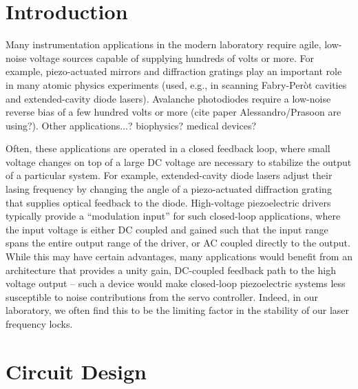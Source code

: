 \documentclass[aip,rsi,preprint,graphicx]{revtex4-1} %
\begin{document}
\section{Introduction}
\label{Sec:Introduction}

Many instrumentation applications in the modern laboratory require agile, low-noise voltage sources capable of supplying hundreds of volts or more.
For example, piezo-actuated mirrors and diffraction gratings play an important role in many atomic physics experiments (used, e.g., in scanning Fabry-Per{\`o}t cavities and extended-cavity diode lasers).
Avalanche photodiodes require a low-noise reverse bias of a few hundred volts or more (cite paper Alessandro/Prasoon are using?).
Other applications...? biophysics? medical devices?

Often, these applications are operated in a closed feedback loop, where small voltage changes on top of a large DC voltage are necessary to stabilize the output of a particular system.
For example, extended-cavity diode lasers adjust their lasing frequency by changing the angle of a piezo-actuated diffraction grating that supplies optical feedback to the diode.
High-voltage piezoelectric drivers typically provide a ``modulation input'' for  such closed-loop applications, where the input voltage is either DC coupled and gained such that the input range spans the entire output range of the driver, or AC coupled directly to the output.
While this may have certain advantages, many applications would benefit from an architecture that provides a unity gain, DC-coupled feedback path to the high voltage output -- such a device would make closed-loop piezoelectric systems less susceptible to noise contributions from the servo controller.
Indeed, in our laboratory, we often find this to be the limiting factor in the stability of our laser frequency locks.




\section{Circuit Design}
\label{Sec:Circuit}
\end{document}
